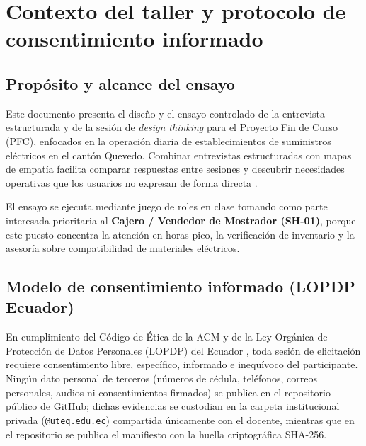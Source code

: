 \section{Contexto del taller y protocolo de consentimiento informado}

\subsection{Prop\'osito y alcance del ensayo}
Este documento presenta el dise\~no y el ensayo controlado de la entrevista estructurada y de la sesi\'on de \emph{design thinking} para el Proyecto Fin de Curso (PFC), enfocados en la operaci\'on diaria de establecimientos de suministros el\'ectricos en el cant\'on Quevedo. Combinar entrevistas estructuradas con mapas de empat\'ia facilita comparar respuestas entre sesiones y descubrir necesidades operativas que los usuarios no expresan de forma directa \cite{pohl2025,ireb2026}.

El ensayo se ejecuta mediante juego de roles en clase tomando como parte interesada prioritaria al \textbf{Cajero / Vendedor de Mostrador (SH-01)}, porque este puesto concentra la atenci\'on en horas pico, la verificaci\'on de inventario y la asesor\'ia sobre compatibilidad de materiales el\'ectricos.

\subsection{Modelo de consentimiento informado (LOPDP Ecuador)}
En cumplimiento del C\'odigo de \'Etica de la ACM \cite{acm2018} y de la Ley Org\'anica de Protecci\'on de Datos Personales (LOPDP) del Ecuador \cite{lopdp2021}, toda sesi\'on de elicitaci\'on requiere consentimiento libre, espec\'ifico, informado e inequ\'ivoco del participante. Ning\'un dato personal de terceros (n\'umeros de c\'edula, tel\'efonos, correos personales, audios ni consentimientos firmados) se publica en el repositorio p\'ublico de GitHub; dichas evidencias se custodian en la carpeta institucional privada (\texttt{@uteq.edu.ec}) compartida \'unicamente con el docente, mientras que en el repositorio se publica el manifiesto con la huella criptogr\'afica SHA-256.

